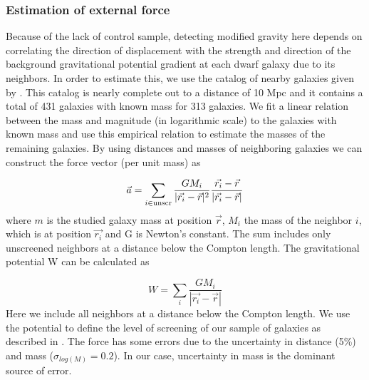 \documentclass[useAMS,usenatbib,twocolumn]{mn2e}
\begin{document}
\subsubsection{Estimation of external force}
Because of the lack of control sample, detecting modified gravity here
depends on correlating the direction of displacement with the strength
and direction of the background gravitational potential gradient at
each dwarf galaxy due to its neighbors.  In order to estimate this,
we use the
catalog of  nearby galaxies given by \citet{kar04}. This catalog is nearly
complete out to a distance of 10 Mpc and it contains a total of 431 galaxies
with known mass for 313 galaxies. We fit a linear relation between the
mass and magnitude (in logarithmic scale) to the galaxies with known mass and
use this empirical relation to estimate the masses of the remaining galaxies.
By using distances and masses of neighboring galaxies we can construct the
force vector (per unit mass) as 

\begin{equation}
\vec{a} =\sum_{i \in {\rm unscr}}{\frac{G M_i}{|\vec{r_i}
-\vec{r}|^2} \frac{\vec{r_i}
-\vec{r}}{|\vec{r_i} -\vec{r}|} }
\label{eq:accelaration}
\end{equation}
where $m$ is the studied galaxy mass at position $\vec{r}$,
 $M_i$ the mass of the
neighbor $i$, which is at position $\vec{r_i}$ and G is Newton's
constant. The sum includes only unscreened neighbors at a distance below the
Compton length. 
The gravitational potential W can be calculated as 

\begin{equation}
 W=\sum_i{\frac{G M_i}{|\vec{r_i} -\vec{r}|}  }
\end{equation}
Here we include all neighbors at a distance below the Compton length. We use the
potential to define the level of screening of our sample of  galaxies as
described in \cite{cabre2012}. The force has some errors due to the
uncertainty in distance (5\%) and mass ($\sigma_{log(M)}=0.2$).
In our case, uncertainty in mass is the
dominant source of error. 
\end{document}

